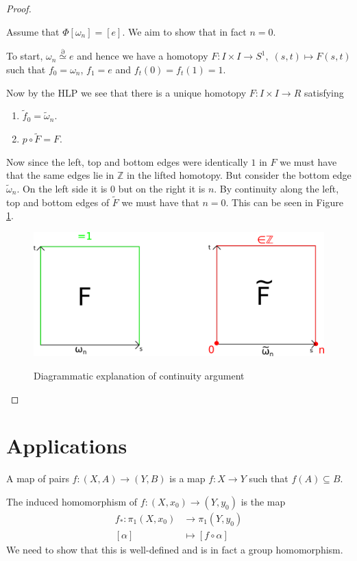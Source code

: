\documentclass[11pt]{article}
\newcommand{\homrel}{\stackrel{\partial}{\simeq}}
\newcommand{\Z}{\mathbb{Z}}
\newenvironment{defin}
	{\begin{mdframed}[backgroundcolor=white, roundcorner=5pt, linewidth=1pt]}
	{\end{mdframed}}
\newcommand{\mdf}[1]{{\color{red} #1}}
\begin{document}
\begin{proof}
\begin{itemize}
		Assume that $\Phi[\omega_n]=[e]$.
		We aim to show that in fact $n=0$.

		To start, $\omega_n\homrel e$ and hence we have a homotopy $F:I\times I\to S^1,\;(s, t)\mapsto F(s, t)$ such that $f_0=\omega_n$, $f_1=e$ and $f_t(0)=f_t(1)=1$.

		Now by the HLP we see that there is a unique homotopy $F:I\times I \to R$ satisfying
		\begin{enumerate}[label=(\roman*)]
			\item $\widetilde{f}_0=\widetilde{\omega}_n$.
			\item $p\circ \widetilde{F}=F$.
		\end{enumerate}

		Now since the left, top and bottom edges were identically $1$ in $F$ we must have that the same edges lie in $\Z$ in the lifted homotopy.
		But consider the bottom edge $\widetilde{\omega}_n$.
		On the left side it is $0$ but on the right it is $n$.
		By continuity along the left, top and bottom edges of $\widetilde{F}$ we must have that $n=0$.
		This can be seen in Figure \ref{fig:circlepi1}.
		\begin{figure}[ht]
			\centering
			\includegraphics{circlepi1.png}
			\label{fig:circlepi1}
			\caption{Diagrammatic explanation of continuity argument}
		\end{figure}	
\end{itemize}
\end{proof}

\section{Applications}
\begin{defin}
	A \mdf{map of pairs} $f:(X,A)\to(Y, B)$ is a map $f:X\to Y$ such that $f(A)\subseteq B$.	

	The \mdf{induced homomorphism} of $f:(X, x_0)\to (Y, y_0)$ is the map
	\begin{align*}	
		f_\ast:\pi_1(X, x_0)&\to \pi_1(Y,y_0)\\
		[\alpha] &\mapsto [f \circ \alpha]
	\end{align*}
	We need to show that this is well-defined and is in fact a group homomorphism.
\end{defin}
\end{document}
